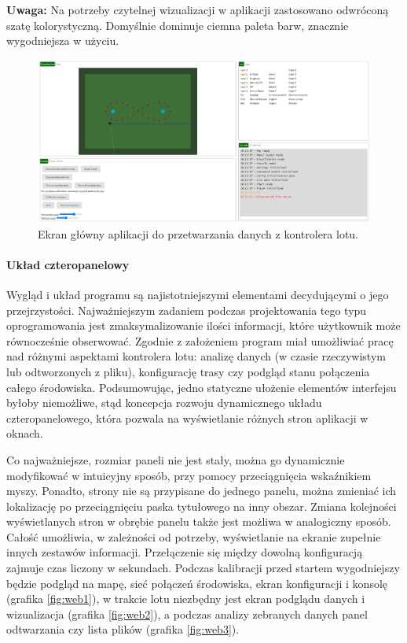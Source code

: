 \documentclass[12pt, a4paper]{article}
\begin{document}
\textbf{Uwaga:} Na potrzeby czytelnej wizualizacji w aplikacji zastosowano odwróconą szatę kolorystyczną. Domyślnie dominuje ciemna paleta barw, znacznie wygodniejsza w użyciu.

 \begin{figure}[ht]
    \centering
    \includegraphics[width=1\textwidth]{weball}
    \caption{Ekran główny aplikacji do przetwarzania danych z kontrolera lotu.}
    \label{fig:weball}
\end{figure}

\paragraph{Układ czteropanelowy}\mbox{}

Wygląd i układ programu są najistotniejszymi elementami decydującymi o jego przejrzystości. Najważniejszym zadaniem podczas projektowania tego typu oprogramowania jest zmaksymalizowanie ilości informacji, które użytkownik może równocześnie obserwować. Zgodnie z założeniem program  miał umożliwiać pracę nad różnymi aspektami kontrolera lotu: analizę danych (w czasie rzeczywistym lub odtworzonych z pliku), konfigurację trasy czy podgląd stanu połączenia całego środowiska. Podsumowując, jedno statyczne ułożenie elementów interfejsu byłoby niemożliwe, stąd koncepcja rozwoju dynamicznego układu czteropanelowego, która pozwala na wyświetlanie różnych stron aplikacji w oknach.

Co najważniejsze, rozmiar paneli nie jest stały, można go dynamicznie modyfikować w intuicyjny sposób, przy pomocy przeciągnięcia wskaźnikiem myszy. Ponadto, strony nie są przypisane do jednego panelu, można zmieniać ich lokalizację po przeciągnięciu paska tytułowego na inny obszar. Zmiana kolejności wyświetlanych stron w obrębie panelu także jest możliwa w analogiczny sposób. Całość umożliwia, w zależności od potrzeby, wyświetlanie na ekranie zupełnie innych zestawów informacji. Przełączenie się między dowolną konfiguracją zajmuje czas liczony w sekundach. Podczas kalibracji przed startem wygodniejszy będzie podgląd na mapę, sieć połączeń środowiska, ekran konfiguracji i konsolę (grafika \ref{fig:web1}), w trakcie lotu niezbędny jest ekran podglądu danych i wizualizacja (grafika \ref{fig:web2}), a podczas analizy zebranych danych panel odtwarzania czy lista plików (grafika \ref{fig:web3}).
\end{document}
